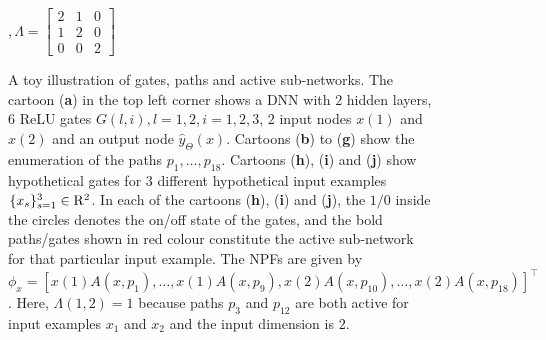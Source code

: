 \documentclass{article}
\begin{document}
\FloatBarrier
\begin{figure}[h]
\centering
{}
\centering
\begin{minipage}{0.64\textwidth}
\\
\\
\end{minipage}
\begin{minipage}{0.25\textwidth}
,\,$\Lambda=\left[\begin{matrix} 
2 &1& 0 \\
1 &2& 0\\
0 &0& 2
\end{matrix}\right]$
\end{minipage}
\caption{A toy illustration of gates, paths and active sub-networks. The cartoon (\textbf{a}) in the top left corner shows a DNN with $2$ hidden layers, $6$ ReLU gates $G(l,i),l=1,2,i=1,2,3$, $2$ input nodes $x(1)$ and $x(2)$ and an output node $\hat{y}_{\Theta}(x)$. Cartoons (\textbf{b}) to (\textbf{g}) show the enumeration of the paths $p_1,\ldots, p_{18}$. Cartoons (\textbf{h}), (\textbf{i}) and (\textbf{j}) show hypothetical gates for $3$ different hypothetical input examples $\{x_s\}_{s=1}^3 \in\mathrm{R}^2$. In each of the cartoons (\textbf{h}), (\textbf{i}) and (\textbf{j}), the $1/0$ inside the circles denotes the on/off state of the gates, and the bold paths/gates shown in red colour constitute the active sub-network for that particular input example. The NPFs are given by $\phi_{x}=[x(1)A(x,p_1),\ldots,x(1)A(x,p_{9}),x(2)A(x,p_{10}),\ldots,x(2)A(x,p_{18})]^\top$. Here, $\Lambda(1,2)=1$ because paths $p_3$ and $p_{12}$ are both active for input examples $x_1$ and $x_2$ and the input dimension is $2$.}
\label{fig:npkexample}
\end{figure}
\end{document}
